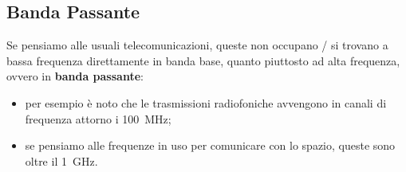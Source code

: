 \documentclass[openany,a4paper,12pt]{book}
\begin{document}
\begin{figure}[H]
\end{figure}

\subsection*{Banda Passante}

Se pensiamo alle usuali telecomunicazioni, queste non occupano / si trovano a bassa frequenza direttamente in banda base, quanto piuttosto ad alta frequenza, ovvero in \textbf{banda passante}:
\begin{itemize}[label=\textcolor{PoliBlue}{\textbullet}]
    \item per esempio è noto che le trasmissioni radiofoniche avvengono in canali di frequenza attorno i \qty{100}{\mega\hertz};
    \item se pensiamo alle frequenze in uso per comunicare con lo spazio, queste sono oltre il \qty{1}{\giga\hertz}.
\end{itemize}
\end{document}
